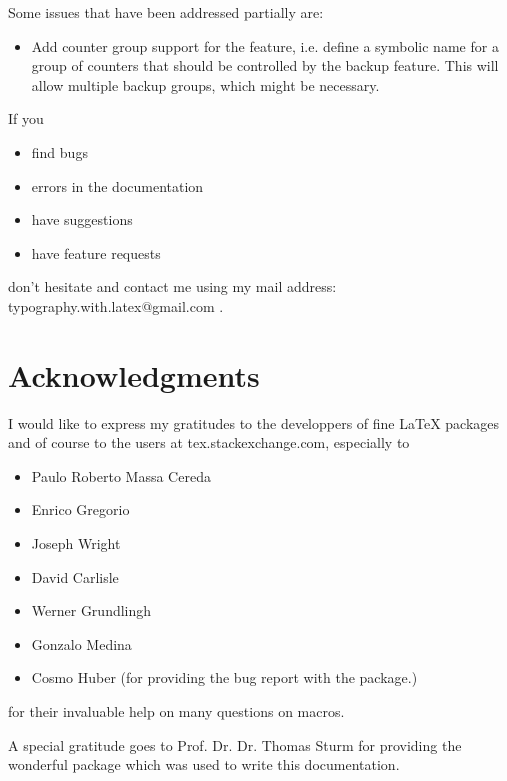\documentclass[12pt,a4paper,oneside]{article}
\makeatletter
\newcommand{\chdocextractversion}[1]{%
  \@nameuse{#1}%
}
\newcommand{\CHDocNew}[1]{%
  \tcbdocmarginnote[doclang/new={N},
  colframe=blue,
  halign=left,
  colback={blue!20!white},
  fontupper={\tiny}
  ]{%
    \chdocextractversion{xassoccntversion#1}%
  }%
}
\newcommand{\mymailtoaddress}{%
  typography.with.latex@gmail.com%
}
\makeatother
\begin{document}
Some issues that have been addressed partially are:

\begin{itemize}
\item \CHDocNew{1.0} Add counter group support for the  feature, i.e. define a symbolic name for a group of counters that should be controlled by the backup feature. This will allow multiple backup groups, which might be necessary. 
\end{itemize}


If you 

\begin{itemize}
  \item find bugs
  \item errors in the documentation
  \item have suggestions
  \item have feature requests
\end{itemize}

don't hesitate and contact me using my mail address: \mymailtoaddress.

\clearpage

\section{Acknowledgments}

I would like to express my gratitudes to the developpers of fine \LaTeX{} packages and of course
to the users at tex.stackexchange.com, especially to

\begin{itemize}
  \item Paulo Roberto Massa Cereda
  \item Enrico Gregorio
  \item Joseph Wright
  \item David Carlisle
  \item Werner Grundlingh
  \item Gonzalo Medina
  \item Cosmo Huber (for providing the bug report with the  package.)
\end{itemize}

for their invaluable help on many questions on macros.

\vspace{2\baselineskip}
\begin{marker}
A special gratitude goes to Prof. Dr. Dr. Thomas Sturm for providing the wonderful  package which was used to
write this documentation.
\end{marker}
\end{document}
